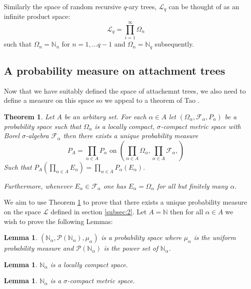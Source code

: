 \documentclass[8pt]{article} %
\newtheorem{theorem}{Theorem}
\newtheorem{lem}[thm]{Lemma}
\theoremstyle{definition}
\begin{document}
Similarly the space of random recursive $q$-ary trees, $\mathcal{L}_q$ can be thought of as an infinite product space:
\[\mathcal{L}_q = \prod_{i=1}^{\infty}\Omega_{n} \]
such that $\Omega_{n} = \mathbb{N}_{n}$ for $n = 1,\dots q-1$ and $\Omega_{n} = \mathbb{N}_{q}$ subsequently. 

\subsection{A probability measure on attachment trees}

Now that we have suitably defined the space of attachemnt trees, we also need to define a measure on this space so we appeal to a theorem of Tao \cite{}.

\begin{theorem}\label{thm:1}
 Let $A$ be an arbitary set.  For each $\alpha \in A$ let $(\Omega_{\alpha},\mathcal{F}_\alpha,P_\alpha)$ be a probability space such that $\Omega_{\alpha}$ is a locally compact, $\sigma$-compact metric space with Borel $\sigma$-algebra $\mathcal{F}_{\alpha}$ then there exists a unique probability measure
 \[
  P_{A} = \prod_{\alpha \in A}P_\alpha \text{   on   } \left(\prod_{\alpha \in A}\Omega_\alpha, \prod_{\alpha \in A}\mathcal{F}_\alpha,\right)  
 \]
Such that $P_A\left(\prod_{\alpha \in A}E_\alpha\right)  = \prod_{\alpha \in A} P_\alpha(E_\alpha)$.  

Furthermore, whenever $E_\alpha \in \mathcal{F}_\alpha$ one has $E_\alpha = \Omega_{\alpha}$ for all but finitely many $\alpha$. 

\end{theorem}

We aim to use Theorem \ref{thm:1} to prove that there exists a unique probability measure on the space $\mathcal{L}$ defined in section \ref{subsec:2}.  
Let $A = \mathbb{N}$ then for all $\alpha \in A$ we wish to prove the following Lemmas:
\begin{lem}
 $(\mathbb{N}_\alpha, \mathcal{P}(\mathbb{N}_\alpha), \mu_\alpha)$ is a probability space where $\mu_\alpha$ is the uniform probability measure and $\mathcal{P}(\mathbb{N}_\alpha) $ is the power set of $\mathbb{N}_\alpha$.  
\end{lem}
\begin{lem}
 $\mathbb{N}_\alpha$ is a locally compact space.
\end{lem}
\begin{lem}
 $\mathbb{N}_\alpha$  is a $\sigma $-compact metric space.  
\end{lem}
\end{document}
